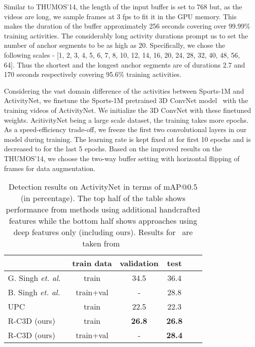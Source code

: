 \documentclass[10pt,twocolumn,letterpaper]{article}
\newcommand{\modelname}[0]{R-C3D }
\begin{document}
Similar to THUMOS'14, the length of the input buffer is set to 768 but, as the videos are long, we sample frames at 3 fps to fit it in the GPU memory.
This makes the duration of the buffer approximately 256 seconds covering over 99.99\% training activities.
The considerably long activity durations prompt us to set the number of anchor segments  to be as high as 20.
Specifically, we chose the following scales - [1, 2, 3, 4, 5, 6, 7, 8, 10, 12, 14, 16, 20, 24, 28, 32, 40, 48, 56, 64].
Thus the shortest and the longest anchor segments are of durations 2.7 and 170 seconds respectively covering 95.6\% training activities.

Considering the vast domain difference of the activities between Sports-1M and ActivityNet, we finetune the Sports-1M pretrained 3D ConvNet model~\cite{tran2015learning} with the training videos of ActivityNet.
We initialize the 3D ConvNet with these finetuned weights.
AcitivityNet being a large scale dataset, the training takes more epochs.
As a speed-efficiency trade-off, we freeze the first two convolutional layers in our model during training.
The learning rate is kept fixed at  for first 10 epochs and is decreased to  for the last 5 epochs.
Based on the improved results on the THUMOS'14, we choose the two-way buffer setting with horizontal flipping of frames for data augmentation.

\begin{table}[!t]
\centering
\caption{Detection results on ActivityNet in terms of mAP@0.5 (in percentage). The top half of the table shows performance from methods using additional handcrafted features while the bottom half shows approaches using deep features only (including ours). Results for~\cite{Singh2016a} are taken from~\cite{activitynetChallenge}}
\small
\begin{tabular}{l || c |c c c c} 
\hline
 ~ & train data & validation  & test   \\ \hline
G. Singh \textit{et. al}.~\cite{Singh2016b} & train & 34.5  & 36.4   \\
B. Singh  \textit{et. al.}~\cite{Singh2016a} & train+val & -  & 28.8   \\ \hline
UPC ~\cite{montes2016temporal} & train & 22.5  & 22.3   \\
\modelname (ours) & train & \textbf{26.8} & \textbf{26.8}\\ \modelname (ours) & train+val & - & \textbf{28.4} \\ \hline
\end{tabular}
\label{res:activitynet}
\end{table}
\end{document}
